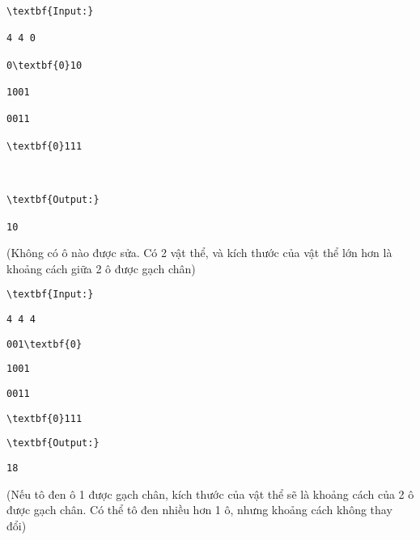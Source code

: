 \begin{verbatim}
\textbf{Input:}

4 4 0

0\textbf{0}10

1001

0011

\textbf{0}111



\textbf{Output:}

10\end{verbatim}

(Không có ô nào được sửa. Có 2 vật thể, và kích thước của vật thể lớn hơn là khoảng cách giữa 2 ô được gạch chân)
\begin{verbatim}
\textbf{Input:}\end{verbatim}
\begin{verbatim}
4 4 4\end{verbatim}
\begin{verbatim}
001\textbf{0}\end{verbatim}
\begin{verbatim}
1001\end{verbatim}
\begin{verbatim}
0011\end{verbatim}
\begin{verbatim}
\textbf{0}111\end{verbatim}
\begin{verbatim}
\textbf{Output:}\end{verbatim}
\begin{verbatim}
18\end{verbatim}

(Nếu tô đen ô 1 được gạch chân, kích thước của vật thể sẽ là khoảng cách của 2 ô được gạch chân. Có thể tô đen nhiều hơn 1 ô, nhưng khoảng cách không thay đổi)
